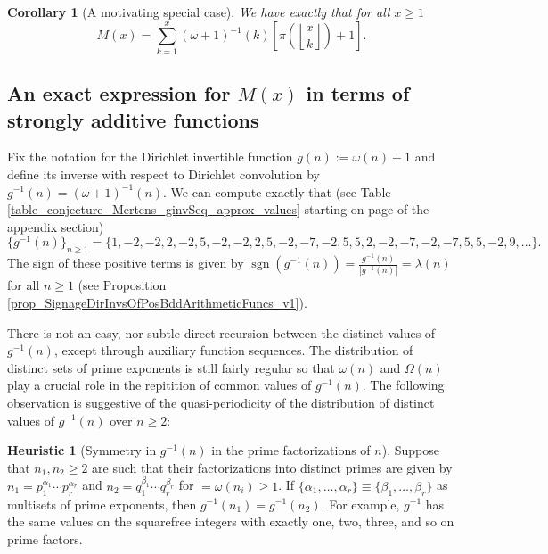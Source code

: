 \documentclass[11pt,reqno,a4letter]{article}
\numberwithin{figure}{section}
\numberwithin{table}{section}
\newcommand{\Floor}[2]{\ensuremath{\left\lfloor \frac{#1}{#2} \right\rfloor}}
\theoremstyle{plain}
\newtheorem{cor}[theorem]{Corollary}
\numberwithin{theorem}{section}
\theoremstyle{definition}
\newtheorem{heuristic}[theorem]{Heuristic}
\begin{document}
\begin{cor}[A motivating special case] 
\label{cor_Mx_gInvnPixk_formula} 
We have exactly that for all $x \geq 1$ 
\begin{equation} 
\label{eqn_Mx_gInvnPixk_formula} 
M(x) = \sum_{k=1}^{x} (\omega+1)^{-1}(k) \left[\pi\left(\Floor{x}{k}\right) + 1\right]. 
\end{equation} 
\end{cor} 

\subsection{An exact expression for $M(x)$ in terms of strongly additive functions} 
\label{example_InvertingARecRelForMx_Intro}

Fix the notation for the Dirichlet invertible function $g(n) := \omega(n) + 1$ and define its 
inverse with respect to Dirichlet convolution by $g^{-1}(n) = (\omega+1)^{-1}(n)$. 
We can compute exactly that 
(see Table \ref{table_conjecture_Mertens_ginvSeq_approx_values} starting on page 
\pageref{table_conjecture_Mertens_ginvSeq_approx_values} of the appendix section) 
\[
\{g^{-1}(n)\}_{n \geq 1} = \{1, -2, -2, 2, -2, 5, -2, -2, 2, 5, -2, -7, -2, 5, 5, 2, -2, -7, -2, 
     -7, 5, 5, -2, 9, \ldots \}. 
\] 
The sign of these positive terms is given by 
$\operatorname{sgn}(g^{-1}(n)) = \frac{g^{-1}(n)}{|g^{-1}(n)|} = \lambda(n)$ for all $n \geq 1$ 
(see Proposition \ref{prop_SignageDirInvsOfPosBddArithmeticFuncs_v1}). 

There is not an easy, nor subtle 
direct recursion between the distinct values of $g^{-1}(n)$, except through auxiliary function sequences. 
The distribution of distinct sets of prime exponents is still fairly regular so that 
$\omega(n)$ and $\Omega(n)$ play a crucial role in the repitition of common values of 
$g^{-1}(n)$. 
The following observation is suggestive of the quasi-periodicity of the distribution of 
distinct values of $g^{-1}(n)$ over $n \geq 2$: 

\begin{heuristic}[Symmetry in $g^{-1}(n)$ in the prime factorizations of $n$] 
Suppose that $n_1, n_2 \geq 2$ are such that their factorizations into distinct primes are 
given by $n_1 = p_1^{\alpha_1} \cdots p_r^{\alpha_r}$ and $n_2 = q_1^{\beta_1} \cdots q_r^{\beta_r}$ 
for $ = \omega(n_i) \geq 1$. 
If $\{\alpha_1, \ldots, \alpha_r\} \equiv \{\beta_1, \ldots, \beta_r\}$ as multisets of prime exponents, 
then $g^{-1}(n_1) = g^{-1}(n_2)$. For example, $g^{-1}$ has the same values on the squarefree integers 
with exactly one, two, three, and so on prime factors.  
\end{heuristic} 
\end{document}
